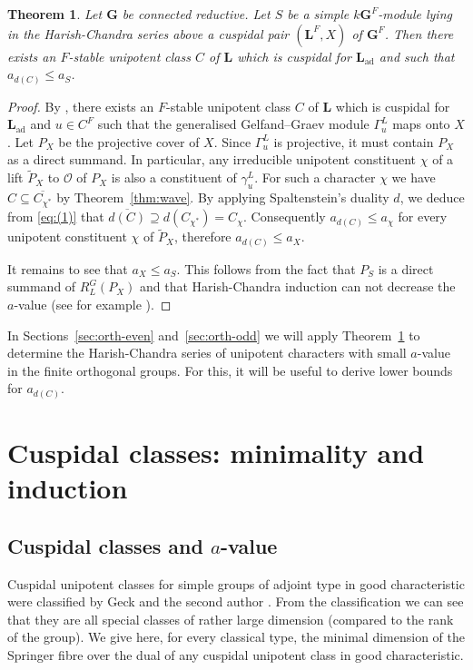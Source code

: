 \documentclass[12pt,leqno,a4paper]{amsart}
\newcommand{\bG}{{\mathbf{G}}}
\newcommand{\bL}{{\mathbf{L}}}
\newcommand{\cO}{{\mathcal{O}}}
\newcommand{\ad}{{\operatorname{ad}}}
\newtheorem{thm}{Theorem}[section]
\theoremstyle{remark}
\begin{document}
\begin{thm}   \label{thm:low a}
 Let $\bG$ be connected reductive. Let $S$ be a simple $k\bG^F$-module lying in
 the Harish-Chandra series above a cuspidal pair $(\bL^F,X)$ of $\bG^F$.
 Then there exists an $F$-stable unipotent class $C$
 of $\bL$ which is cuspidal for $\bL_\ad$ and such that $a_{d(C)}\le a_S$.
\end{thm}

\begin{proof}
By \cite[Thm.~2.3]{DM17}, there exists an $F$-stable unipotent class $C$ of
$\bL$ which is cuspidal for $\bL_\ad$ and $u \in C^F$ such that the generalised
Gelfand--Graev module $\Gamma_u^L$ maps onto $X$. Let $P_X$ be the projective
cover of $X$. Since $\Gamma_u^L$ is projective, it must contain $P_X$ as a
direct summand. In particular, any irreducible unipotent constituent $\chi$ of
a lift $\tilde P_X$ to $\cO$ of $P_X$ is also a constituent of $\gamma_u^L$.
For such a character $\chi$ we have $C\subseteq \overline{C_{\chi^*}}$ by
Theorem~\ref{thm:wave}. By applying Spaltenstein's duality $d$, we deduce from
\eqref{eq:(1)} that $\overline{d(C)} \supseteq d(C_{\chi^*}) = C_\chi$.
Consequently $a_{d(C)} \leq a_\chi$ for every unipotent constituent
$\chi$ of $\tilde P_X$, therefore $a_{d(C)} \leq a_X$.
\smallskip

It remains to see that $a_X \leq a_S$. This follows from the fact that
$P_S$ is a direct summand of $R_L^G(P_X)$ and that Harish-Chandra
induction can not decrease the $a$-value (see for example \cite[Cor.~8.7]{LuB}).
\end{proof}

In Sections~\ref{sec:orth-even} and~\ref{sec:orth-odd} we will apply
Theorem~\ref{thm:low a} to determine the Harish-Chandra series of unipotent
characters with small $a$-value in the finite orthogonal groups. For this, it
will be useful to derive lower bounds for $a_{d(C)}$.


\section{Cuspidal classes: minimality and induction}

\subsection{Cuspidal classes and $a$-value}
Cuspidal unipotent classes for simple groups of adjoint type in good
characteristic were classified by Geck and the second author
\cite[Prop.~3.6]{GM96}. From the classification we can see that they are all
special classes of rather large dimension (compared to the rank of the group).
We give here, for every classical type, the minimal dimension of the Springer
fibre over the dual of any cuspidal unipotent class in good characteristic.
\end{document}
